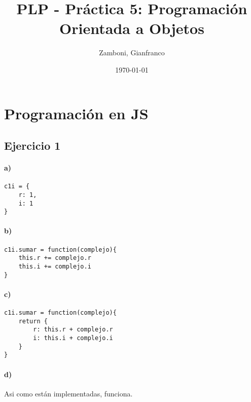 \documentclass[10pt,a4paper]{article}
\begin{document}
\title{PLP - Práctica 5: Programación Orientada a Objetos}
%
\date{\today}
%
\author{Zamboni, Gianfranco}
%
\maketitle
\setcounter{page}{1}
%
\section*{Programación en JS}
\subsection{Ejercicio 1}
\begin{multicols}{2}
\paragraph{a)}
\begin{centrado2}
\begin{verbatim}
c1i = {
    r: 1,
    i: 1
}
\end{verbatim}
\end{centrado2}
\paragraph{b)}
\begin{centrado2}
\begin{verbatim}
c1i.sumar = function(complejo){
    this.r += complejo.r
    this.i += complejo.i
}
\end{verbatim}
\end{centrado2}
\end{multicols}
\begin{multicols}{2}
\paragraph{c)}
\begin{centrado2}
\begin{verbatim}
c1i.sumar = function(complejo){
    return {
        r: this.r + complejo.r
        i: this.i + complejo.i
    }
}
\end{verbatim}
\end{centrado2}

\paragraph{d)} Asi como están implementadas, funciona.
\end{multicols}
\end{document}
